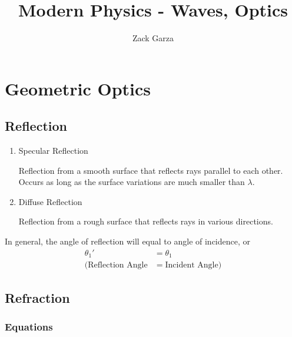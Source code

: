 \documentclass[a4paper,10pt]{report}
\begin{document}
\title{Modern Physics - Waves, Optics}
\author{Zack Garza}
\maketitle
\tableofcontents

\chapter{Geometric Optics}
\section{Reflection}
\begin{enumerate}
 \item Specular Reflection

 Reflection from a smooth surface that reflects rays parallel to each other. Occurs as long as the surface variations are much smaller than $\lambda$.

 \item Diffuse Reflection

 Reflection from a rough surface that reflects rays in various directions.

\end{enumerate}

In general, the angle of reflection will equal to angle of incidence, or
\begin{align*}
 \theta_{1}' &= \theta_1 \\
 (\text{Reflection Angle} &= \text{Incident Angle})
\end{align*}


\section{Refraction}
\subsection{Equations}
\end{document}
